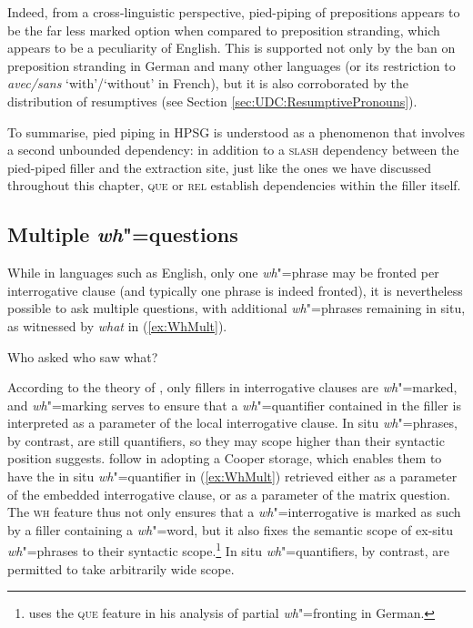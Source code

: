 \documentclass[output=paper
	        ,collection
	        ,collectionchapter
 	        ,biblatex
                ,babelshorthands
                ,newtxmath
                ,draftmode
                ,colorlinks, citecolor=brown
]{langscibook}
\begin{document}
{\begin{exe}
  \ex \label{ex:WhPiedPipingOblique}
  \begin{xlist}
  \end{xlist}
\end{exe}

\noindent
Indeed, from a cross-linguistic perspective, pied-piping of
prepositions appears to be the far less marked option when compared to
preposition stranding, which appears to be a peculiarity of
English. This is supported not only by the ban on preposition
stranding in German and many other languages (or its restriction to
\textit{avec/sans} `with'/`without' in French), but it is also
corroborated by the distribution of resumptives (see Section
\ref{sec:UDC:ResumptivePronouns}).

To summarise, pied piping in HPSG is understood as a phenomenon that
involves a second unbounded dependency: in addition to a
\textsc{slash} dependency between the pied-piped filler and the
extraction site, just like the ones we have discussed throughout this
chapter, \textsc{que} or \textsc{rel} establish dependencies within
the filler itself.

\subsection{Multiple \emph{wh}"=questions}


While in languages such as English, only one \emph{wh}"=phrase may be
fronted per interrogative clause (and typically one phrase is indeed
fronted), it is nevertheless possible to ask multiple questions, with
additional \emph{wh}"=phrases remaining in situ, as witnessed by
\textit{what} in (\ref{ex:WhMult}).

\begin{exe}
  \ex Who asked who saw what? \label{ex:WhMult}
\end{exe}

\noindent
According to the theory of \citet{Ginzburg:Sag:01}, only fillers in
interrogative clauses are \emph{wh}"=marked, and \emph{wh}"=marking
serves to ensure that a \emph{wh}"=quantifier contained in the filler
is interpreted as a parameter of the local interrogative clause. In
situ \emph{wh}"=phrases, by contrast, are still quantifiers, so they
may scope higher than their syntactic position suggests.
\citet{Ginzburg:Sag:01} follow \citet{Pollard:Sag:94} in adopting a
Cooper storage, which enables them to have the in situ
\emph{wh}"=quantifier in (\ref{ex:WhMult}) retrieved either as a
parameter of the embedded interrogative clause, or as a parameter of
the matrix question. The \textsc{wh} feature thus not only ensures
that a \emph{wh}"=interrogative is marked as such by a filler
containing a \emph{wh}"=word, but it also fixes the semantic scope of
ex-situ \emph{wh}"=phrases to their syntactic
scope.\footnote{\citet{kathol:scope-marking} uses the \textsc{que}
  feature in his analysis of partial \emph{wh}"=fronting in German. }
In situ \emph{wh}"=quantifiers, by contrast, are permitted to take
arbitrarily wide scope.

}
\end{document}
